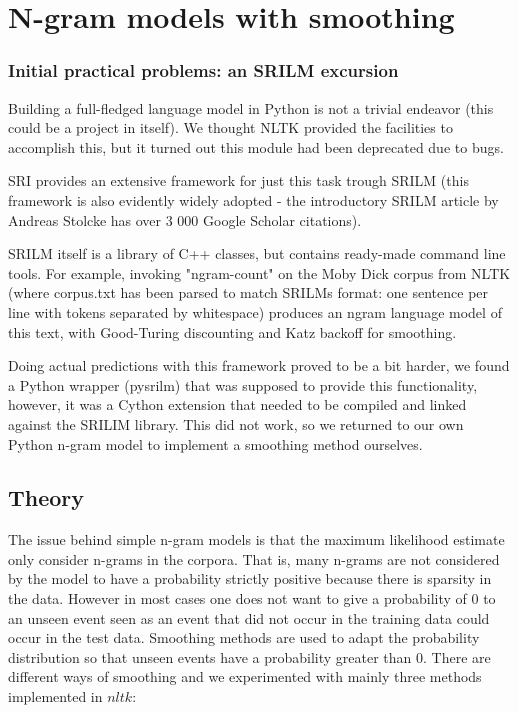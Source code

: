 \documentclass[a4paper,12pt]{article}
\begin{document}
\section{N-gram models with smoothing}

\subsubsection{Initial practical problems: an SRILM excursion}
Building a full-fledged language model in Python is not a trivial endeavor (this could be a project in itself). We thought NLTK provided the facilities to accomplish this, but it turned out this module had been deprecated due to bugs. 

SRI provides an extensive framework for just this task trough SRILM (this framework is also evidently widely adopted - the introductory SRILM article by Andreas Stolcke has over 3 000 Google Scholar citations). 

SRILM itself is a library of C++ classes, but contains ready-made command line tools. For example, invoking "ngram-count" on the Moby Dick corpus from NLTK (where corpus.txt has been parsed to match SRILMs format: one sentence per line with tokens separated by whitespace) produces an ngram language model of this text, with Good-Turing discounting and Katz backoff for smoothing.

Doing actual predictions with this framework proved to be a bit harder, we found a Python wrapper (pysrilm) that was supposed to provide this functionality, however, it was a Cython extension that needed to be compiled and linked against the SRILIM library. This did not work, so we returned to our own Python n-gram model to implement a smoothing method ourselves.

\label{sec:ngramsmoothing}

\subsection{Theory}
	The issue behind simple n-gram models is that the maximum likelihood estimate only consider n-grams in the corpora. That is, many n-grams are not considered by the model to have a probability strictly positive because there is sparsity in the data. However in most cases one does not want to give a probability of 0 to an unseen event seen as an event that did not occur in the training data could occur in the test data. Smoothing methods are used to adapt the probability distribution so that unseen events have a probability greater than 0. There are different ways of smoothing and we experimented with mainly three methods implemented in $nltk$:
	
\end{document}
